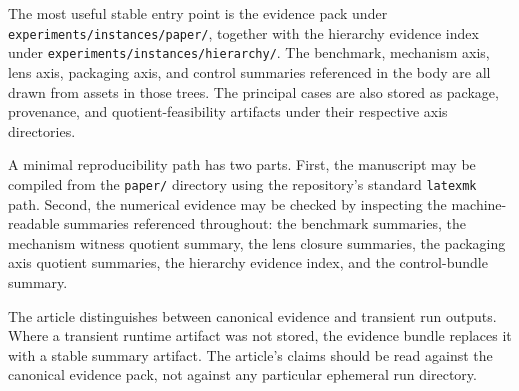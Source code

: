 \documentclass[11pt]{article}
\theoremstyle{definition}
\begin{document}
The most useful stable entry point is the evidence pack under \texttt{experiments/instances/paper/}, together with the hierarchy evidence index under \texttt{experiments/instances/hierarchy/}. The benchmark, mechanism axis, lens axis, packaging axis, and control summaries referenced in the body are all drawn from assets in those trees. The principal cases are also stored as package, provenance, and quotient-feasibility artifacts under their respective axis directories.

A minimal reproducibility path has two parts. First, the manuscript may be compiled from the \texttt{paper/} directory using the repository's standard \texttt{latexmk} path. Second, the numerical evidence may be checked by inspecting the machine-readable summaries referenced throughout: the benchmark summaries, the mechanism witness quotient summary, the lens closure summaries, the packaging axis quotient summaries, the hierarchy evidence index, and the control-bundle summary.

The article distinguishes between canonical evidence and transient run outputs. Where a transient runtime artifact was not stored, the evidence bundle replaces it with a stable summary artifact. The article's claims should be read against the canonical evidence pack, not against any particular ephemeral run directory.



\end{document}
